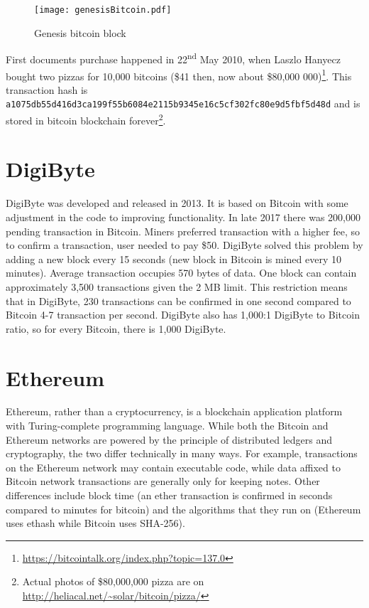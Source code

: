 \begin{figure}[h]
    \centering
    \texttt{[image: genesisBitcoin.pdf]}
    \caption{Genesis bitcoin block}
    \label{genesisBitcoin}
\end{figure}

First documents purchase happened in 22\textsuperscript{nd} May 2010, when Laszlo Hanyecz bought two pizzas for 10,000 bitcoins (\$41 then, now about \$80,000 000)\footnote{\url{https://bitcointalk.org/index.php?topic=137.0}}. This transaction hash is \texttt{a1075db55d416d3ca199f55b6084e\-2115b9345e16c5cf302fc80e9d5fbf5d48d} and is stored in bitcoin blockchain forever\footnote{Actual photos of \$80,000,000 pizza are on \url{http://heliacal.net/~solar/bitcoin/pizza/}}.


\section{DigiByte}
DigiByte was developed and released in 2013. It is based on Bitcoin with some adjustment in the code to improving functionality. In late 2017 there was 200,000 pending transaction in Bitcoin. Miners preferred transaction with a higher fee, so to confirm a transaction, user needed to pay \$50. DigiByte solved this problem by adding a new block every 15 seconds (new block in Bitcoin is mined every 10 minutes). Average transaction occupies 570 bytes of data. One block can contain approximately 3,500 transactions given the 2 MB limit. This restriction means that in DigiByte, 230 transactions can be confirmed in one second compared to Bitcoin 4-7 transaction per second. DigiByte also has 1,000:1 DigiByte to Bitcoin ratio, so for every Bitcoin, there is 1,000 DigiByte. \cite{digibyteBook, dascano2018digibyte}


\section{Ethereum}
Ethereum, rather than a cryptocurrency, is a blockchain application platform with Turing-complete programming language. While both the Bitcoin and Ethereum networks are powered by the principle of distributed ledgers and cryptography, the two differ technically in many ways. For example, transactions on the Ethereum network may contain executable code, while data affixed to Bitcoin network transactions are generally only for keeping notes. Other differences include block time (an ether transaction is confirmed in seconds compared to minutes for bitcoin) and the algorithms that they run on (Ethereum uses ethash while Bitcoin uses SHA-256). \cite{wood2014ethereum, buterin2014next}



